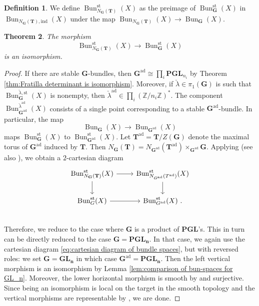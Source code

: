 \documentclass[10pt, a4paper]{amsart}
\newtheorem{theorem}{Theorem}[section]
\theoremstyle{definition}
\newtheorem{definition}[theorem]{Definition}
\theoremstyle{myitemstyle}
\newcommand{\Z}{\mathbb{Z}}
\newcommand{\lambdacheck}{\check{\lambda}}
\newcommand{\bfG}{\mathbf{G}}
\newcommand{\bfT}{\mathbf{T}}
\newcommand{\bPGL}{\mathbf{PGL}}
\DeclareMathOperator{\Bun}{Bun}
\newcommand{\st}{\mathrm{st}}
\newcommand{\ind}{\mathrm{ind}}
\newcommand{\ad}{{\mathrm{ad}}}
\begin{document}
\begin{definition}
    We define $\Bun_{N_\bfG(\bfT)}^{\st}(X)$ as the preimage of $\Bun_\mathbf{G}^{\st}(X)$ in $\Bun_{N_\bfG(\bfT),\ind}(X)$ under the map $\Bun_{N_\bfG(\bfT)}(X)\to \Bun_\mathbf{G}(X)$.
\end{definition}

\begin{theorem}
    The morphism
    \[
    \Bun^{\st}_{N_\bfG(\bfT)}(X)\longrightarrow \Bun_\mathbf{G}^{\st}(X) 
    \]
    is an isomorphism.
    \label{thm:stableisomorphism}
\end{theorem}

\begin{proof}
    If there are stable $\mathbf{G}$-bundles, then $\mathbf{G}^\ad\cong \prod_{i}\bPGL_{n_i}$ by Theorem \ref{thm:Fratilla determinant is isomorphism}. Moreover, if $\lambdacheck\in \pi_1(\mathbf{G})$ is such that $\Bun^{\lambdacheck,\st}_\mathbf{G}(X)$ is nonempty, then $\lambdacheck^{\ad}\in \prod_i (\Z/n_i\Z)^*$. The component $\Bun^{\lambdacheck^\ad}_{\mathbf{G}^\ad}(X)$ consists of a single point corresponding to a stable $\mathbf{G}^\ad$-bundle. In particular, the map
    \[
    \Bun_\mathbf{G}(X) \longrightarrow \Bun_{\mathbf{G}^\ad}(X)
    \]
    maps $\Bun_\mathbf{G}^{\st}(X)$ to $\Bun^{\st}_{\mathbf{G}^\ad}(X)$. Let $\mathbf{T}^\ad=\mathbf{T}/Z(\mathbf{G})$ denote the maximal torus of $\mathbf{G}^\ad$ induced by $\mathbf{T}$. Then $N_\bfG(\bfT)= N_{\mathbf{G}^\ad}(\mathbf{T}^\ad)\times_{\mathbf{G}^\ad} \mathbf{G}$. Applying \cite[Lemma 2.2.1]{BiswasHoffmann} (see also \cite{BiswasHoffmannError}), we obtain a $2$-cartesian diagram
    \begin{equation}
    \label{eq:cartesian diagram of bundle spaces}
    \begin{tikzcd}
        \Bun^{\st}_{N_\bfG(\bfT)}(X) \arrow[d]\arrow[r] &
            \Bun^{\st}_{N_{G^\ad}(T^\ad)}(X) \arrow[d]\\
        \Bun^{\st}_G(X) \arrow[r] &
            \Bun^{\st}_{G^\ad}(X) \ . \\    
    \end{tikzcd}
    \end{equation}
    Therefore, we reduce to the case where $\mathbf{G}$ is a product of $\mathbf{PGL}$'s. This in turn can be directly reduced to the case $\mathbf{G}=\mathbf{PGL_n}$. In that case, we again use the cartesian diagram \eqref{eq:cartesian diagram of bundle spaces}, but with reversed roles: we set $\mathbf{G}=\mathbf{GL_n}$ in which case $\mathbf{G}^\ad=\mathbf{PGL_n}$. Then the left vertical morphism is an isomorphism by Lemma \ref{lem:comparison of bun-spaces for GL_n}. Moreover, the lower horizontal morphism is smooth by \cite[Corollary 4.2]{Hoffmann} and surjective. Since being an isomorphism is local on the target in the smooth topology and the vertical morphisms are representable by \cite[Fact 2.3]{Hoffmann}, we are done.
\end{proof}
\end{document}
